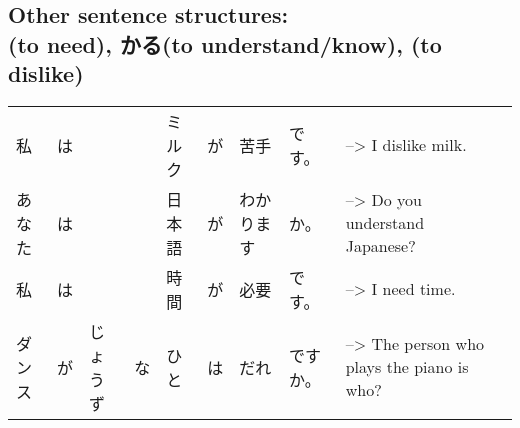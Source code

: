 \documentclass{article}
\newcommand\tab[1][1cm]{\hspace*{#1}}
\begin{document}
\subsection{Other sentence structures: \\  (to need), かる(to understand/know), (to dislike) }
\vspace{1mm}
\tab \begin{tabular}{ l l l l l l l l l l }
私&は&&&ミルク&が&苦手&です。& --> I dislike milk.\\
あなた&は&&&日本語&が&わかります&か。& --> Do you understand Japanese?\\
私&は&&&時間&が&必要&です。& --> I need time.\\
ダンス&が&じょうず&な&ひと&は&だれ&ですか。& --> The person who plays the piano is who?\\
\end{tabular}
\end{document}
